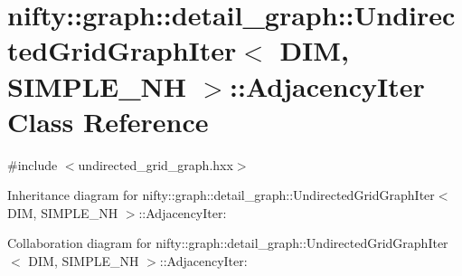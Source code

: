 \hypertarget{classnifty_1_1graph_1_1detail__graph_1_1UndirectedGridGraphIter_1_1AdjacencyIter}{}\section{nifty\+:\+:graph\+:\+:detail\+\_\+graph\+:\+:Undirected\+Grid\+Graph\+Iter$<$ D\+I\+M, S\+I\+M\+P\+L\+E\+\_\+\+N\+H $>$\+:\+:Adjacency\+Iter Class Reference}
\label{classnifty_1_1graph_1_1detail__graph_1_1UndirectedGridGraphIter_1_1AdjacencyIter}


{\ttfamily \#include $<$undirected\+\_\+grid\+\_\+graph.\+hxx$>$}



Inheritance diagram for nifty\+:\+:graph\+:\+:detail\+\_\+graph\+:\+:Undirected\+Grid\+Graph\+Iter$<$ D\+I\+M, S\+I\+M\+P\+L\+E\+\_\+\+N\+H $>$\+:\+:Adjacency\+Iter\+:


Collaboration diagram for nifty\+:\+:graph\+:\+:detail\+\_\+graph\+:\+:Undirected\+Grid\+Graph\+Iter$<$ D\+I\+M, S\+I\+M\+P\+L\+E\+\_\+\+N\+H $>$\+:\+:Adjacency\+Iter\+:
